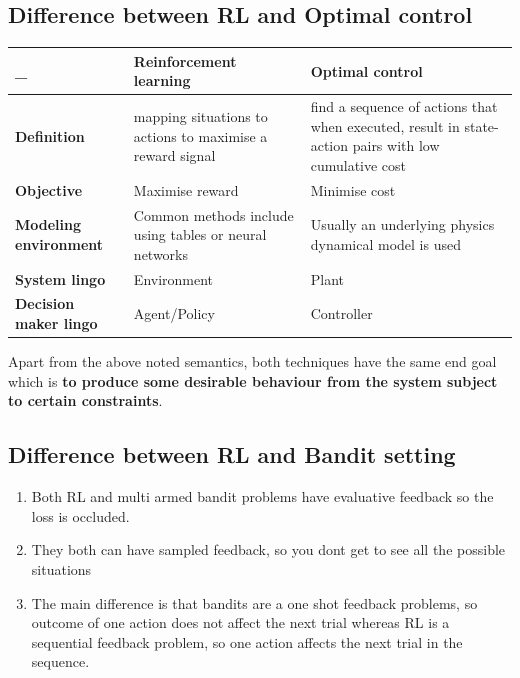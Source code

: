 \documentclass[11pt]{article}
\begin{document}
\subsection{Difference between RL and Optimal control}
\begin{center}
\begin{tabular}{ | m{3cm} | m{6cm}| m{6cm} | } 
  \hline
  _ & \textbf{Reinforcement learning} & \textbf{Optimal control} \\ 
  \hline
  \textbf{Definition} & mapping situations to actions to maximise a reward signal & find a sequence of actions that when executed, result in state-action pairs with low cumulative cost \\ 
  \hline
  \textbf{Objective} & Maximise reward & Minimise cost \\ 
  \hline
  \textbf{Modeling environment} & Common methods include using tables or neural networks  & Usually an underlying physics dynamical model is used \\ 
  \hline
  \textbf{System lingo} & Environment  & Plant \\ 
  \hline
  \textbf{Decision maker lingo} & Agent/Policy  & Controller \\ 
  \hline
\end{tabular}
\end{center}

Apart from the above noted semantics, both techniques have the same end goal which is \textbf{to produce some desirable behaviour from the system subject to certain constraints}.


\subsection{Difference between RL and Bandit setting}
\begin{enumerate}
\item Both RL and multi armed bandit problems have evaluative feedback so the loss is occluded.
\item They both can have sampled feedback, so you dont get to see all the possible situations
\item The main difference is that bandits are a one shot feedback problems, so outcome of one action does not affect the next trial whereas RL is a sequential feedback problem, so one action affects the next trial in the sequence.
\end{enumerate}
\end{document}
